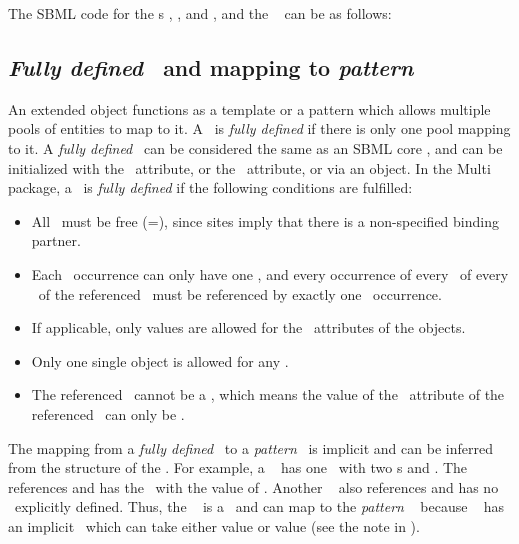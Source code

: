 The SBML code for the \speciesType s , , and , and the \species\  can be as follows:


\clearpage

\subsection{\emph{Fully defined} \species\ and mapping to \emph{pattern} \species}
\label{def:Species:FullyDefined}

An extended \ExSpecies object functions as a template or a pattern which allows multiple pools of entities to map to it. A \species\ is \emph{fully defined} if there is only one pool mapping to it. A \emph{fully defined} \species\ can be considered the same as an SBML core \species, and can be initialized with the \initialAmountAtt\ attribute, or the \initialConcentrationAtt\ attribute, or via an \InitialAssignment object. In the Multi package, a \species\ is \emph{fully defined} if the following conditions are fulfilled:

\begin{itemize}
 \item All \outwardBindingSites\ must be free (\bindingStatusAtt=), since  sites imply that there is a non-specified binding partner.
 \item Each \speciesFeature\ occurrence can only have one \speciesFeatureValue, and every occurrence of every \speciesFeatureType\ of every \component\ of the referenced \speciesType\ must be referenced by exactly one \speciesFeature\  occurrence.
 \item If applicable, only  values are allowed for the \relationAtt\ attributes of the \SubListOfSpeciesFeatures objects.
 \item Only one single \SpeciesFeatureValue object is allowed for any \speciesFeature.
 \item The referenced \compartment\ cannot be a , which means the value of the \isTypeAtt\ attribute of the referenced \compartment\ can only be .
\end{itemize}

The mapping from a \emph{fully defined} \species\ to a \emph{pattern} \species\ is implicit and can be inferred from the structure of the \species. For example, a \speciesType\  has one \speciesFeatureType\ with two \possibleSpeciesFeatureValue s  and . The \species\   references  and has the \speciesFeature\ with the value of . Another \species\  also references  and has no \speciesFeature\ explicitly defined. Thus, the \species\  is a  \species\ and can map to the \emph{pattern} \species\  because \species\  has an implicit \speciesFeature\ which can take either value  or value  (see the note in ).


